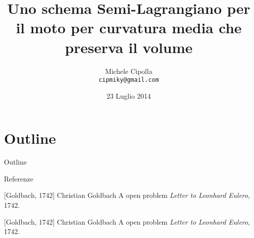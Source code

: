 \documentclass[10pt]{beamer}
\title{Uno schema Semi-Lagrangiano per il moto per curvatura media che
  preserva il volume}
\author{Michele Cipolla \\
\texttt{cipmiky@gmail.com}}
\institute[Dip. Matematica]{Univeristà la Sapienza di Roma}
\date{23 Luglio 2014}
\begin{document}
%
%
\begin{frame}
\titlepage
\end{frame}
%
%
\section*{Outline}
\begin{frame}{Outline}
\tableofcontents
\end{frame}
%
%





%
%
\begin{frame}{Referenze}
\begin{thebibliography}{Goldbach, 1742}
[Goldbach, 1742]
  Christian Goldbach
  \newblock A open problem
  \newblock \emph{Letter to Leonhard Eulero}, 1742.

[Goldbach, 1742]
  Christian Goldbach
  \newblock A open problem
  \newblock \emph{Letter to Leonhard Eulero}, 1742.
\end{thebibliography}
\end{frame}
%
%
%
\end{document}
